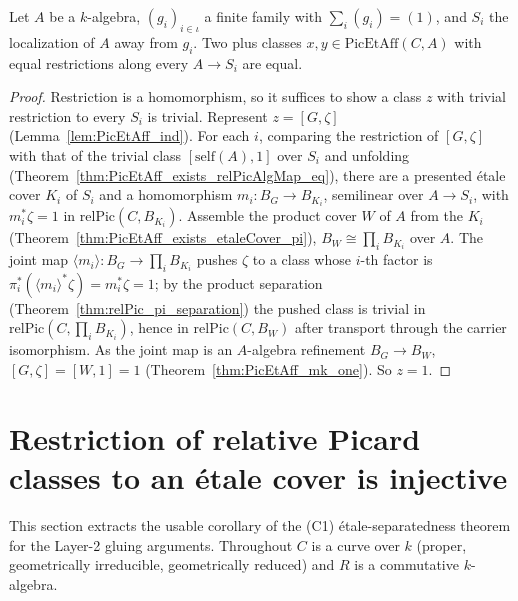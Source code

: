 \begin{theorem}
  \label{thm:PicEtAff_eq_of_away_eq}
  \leanok
  Let \(A\) be a \(k\)-algebra, \((g_i)_{i \in \iota}\) a finite family with \(\sum_i (g_i) = (1)\),
  and \(S_i\) the localization of \(A\) away from \(g_i\). Two plus classes \(x, y \in
  \mathrm{PicEtAff}(C, A)\) with equal restrictions along every \(A \to S_i\) are equal.
\end{theorem}
\begin{proof}
  \leanok
  Restriction is a homomorphism, so it suffices to show a class \(z\) with trivial restriction to
  every \(S_i\) is trivial. Represent \(z = [G, \zeta]\) (Lemma~\ref{lem:PicEtAff_ind}). For each
  \(i\), comparing the restriction of \([G, \zeta]\) with that of the trivial class
  \([\mathrm{self}(A), 1]\) over \(S_i\) and unfolding (Theorem~\ref{thm:PicEtAff_exists_relPicAlgMap_eq}),
  there are a presented \'etale cover \(K_i\) of \(S_i\) and a homomorphism \(m_i \colon B_G \to
  B_{K_i}\), semilinear over \(A \to S_i\), with \(m_i^{*}\zeta = 1\) in \(\mathrm{relPic}(C,
  B_{K_i})\). Assemble the product cover \(W\) of \(A\) from the \(K_i\)
  (Theorem~\ref{thm:PicEtAff_exists_etaleCover_pi}), \(B_W \cong \prod_i B_{K_i}\) over \(A\). The
  joint map \(\langle m_i \rangle \colon B_G \to \prod_i B_{K_i}\) pushes \(\zeta\) to a class whose
  \(i\)-th factor is \(\pi_i^{*}(\langle m_i\rangle^{*}\zeta) = m_i^{*}\zeta = 1\); by the product
  separation (Theorem~\ref{thm:relPic_pi_separation}) the pushed class is trivial in
  \(\mathrm{relPic}(C, \prod_i B_{K_i})\), hence in \(\mathrm{relPic}(C, B_W)\) after transport
  through the carrier isomorphism. As the joint map is an \(A\)-algebra refinement \(B_G \to B_W\),
  \([G, \zeta] = [W, 1] = 1\) (Theorem~\ref{thm:PicEtAff_mk_one}). So \(z = 1\).
\end{proof}

\section{Restriction of relative Picard classes to an \'etale cover is injective}

This section extracts the usable corollary of the (C1) \'etale-separatedness theorem for the
Layer-2 gluing arguments. Throughout \(C\) is a curve over \(k\) (proper, geometrically irreducible,
geometrically reduced) and \(R\) is a commutative \(k\)-algebra.

